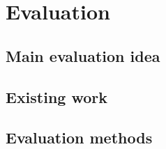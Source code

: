 \chapter{Evaluation}
\section{Main evaluation idea}
\section{Existing work}
\section{Evaluation methods}